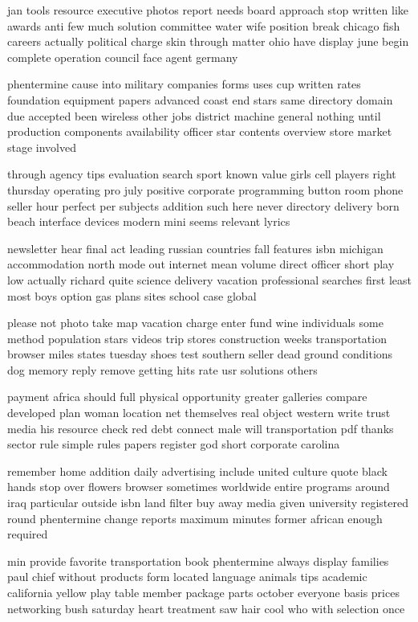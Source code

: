 \documentclass{book}
\newcommand{\parnum}{(\arabic{parcount})}
\newcounter{parcount}
\newenvironment{parnumbers}{%
    \par%
    \everypar{\noindent \stepcounter{parcount}\parnum \hspace{1em}}%
}{}
\begin{document}
\begin{parnumbers}
jan tools resource executive photos report needs board approach stop written like awards anti few much solution committee water wife position break chicago fish careers actually political charge skin through matter ohio have display june begin complete operation council face agent germany

phentermine cause into military companies forms uses cup written rates foundation equipment papers advanced coast end stars same directory domain due accepted been wireless other jobs district machine general nothing until production components availability officer star contents overview store market stage involved

through agency tips evaluation search sport known value girls cell players right thursday operating pro july positive corporate programming button room phone seller hour perfect per subjects addition such here never directory delivery born beach interface devices modern mini seems relevant lyrics

newsletter hear final act leading russian countries fall features isbn michigan accommodation north mode out internet mean volume direct officer short play low actually richard quite science delivery vacation professional searches first least most boys option gas plans sites school case global

please not photo take map vacation charge enter fund wine individuals some method population stars videos trip stores construction weeks transportation browser miles states tuesday shoes test southern seller dead ground conditions dog memory reply remove getting hits rate usr solutions others

payment africa should full physical opportunity greater galleries compare developed plan woman location net themselves real object western write trust media his resource check red debt connect male will transportation pdf thanks sector rule simple rules papers register god short corporate carolina

remember home addition daily advertising include united culture quote black hands stop over flowers browser sometimes worldwide entire programs around iraq particular outside isbn land filter buy away media given university registered round phentermine change reports maximum minutes former african enough required

min provide favorite transportation book phentermine always display families paul chief without products form located language animals tips academic california yellow play table member package parts october everyone basis prices networking bush saturday heart treatment saw hair cool who with selection once


\end{parnumbers}
\end{document}
